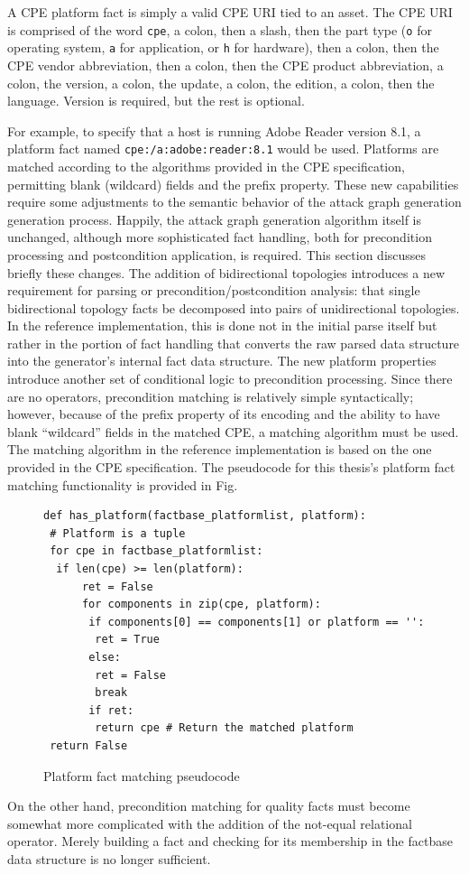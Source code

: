 A CPE platform fact is simply a valid CPE URI tied to an asset. The CPE URI is
comprised of the word \texttt{cpe}, a 
colon, then a slash, then the part type (\texttt{o} for operating system, \texttt{a} for
application, or \texttt{h} for hardware), then a colon, then the CPE vendor abbreviation,
then a colon, then the CPE product abbreviation, a colon, the version, a colon, the update, a colon, 
the edition, a colon, then the language. Version is required, but the rest is optional.

For example, to specify that a host is running Adobe Reader version 8.1, a 
platform fact named \texttt{cpe:/a:adobe:reader:8.1} would be used. Platforms
are matched according to the algorithms provided in the CPE specification,
permitting blank (wildcard) fields and the prefix property.
These new capabilities require some adjustments to the semantic behavior of the
attack graph generation generation process. Happily, the attack graph generation
algorithm itself is unchanged, although more sophisticated fact handling,
both for precondition processing and postcondition application,
is required. This section discusses briefly these changes.
The addition of bidirectional topologies introduces a new requirement for
parsing or precondition/postcondition analysis: that single bidirectional 
topology facts be decomposed into pairs
of unidirectional topologies. In the reference implementation, this is done
not in the initial parse itself but rather in the portion of fact handling that
converts the raw parsed data structure into the generator's internal fact
data structure.
The new platform properties introduce another set of conditional logic to
precondition processing. Since there are no operators, precondition matching
is relatively simple syntactically; however, because of the prefix
property of its encoding and the ability to have blank ``wildcard'' fields
in the matched CPE, a matching algorithm must be used. The matching algorithm
in the reference implementation is based on the one provided in the CPE
specification. %
The pseudocode for this thesis's platform fact matching functionality is
provided in Fig.~\cite{fig:cpe_match_pc}

\begin{figure}
\begin{lstlisting}
def has_platform(factbase_platformlist, platform):
 # Platform is a tuple
 for cpe in factbase_platformlist:
  if len(cpe) >= len(platform):
      ret = False
      for components in zip(cpe, platform):
       if components[0] == components[1] or platform == '':
        ret = True
       else:
        ret = False
        break
       if ret:
        return cpe # Return the matched platform
 return False
\end{lstlisting}
\caption{Platform fact matching pseudocode}
\label{fig:cpe_match_pc}
\end{figure}
On the other hand, precondition matching for quality facts must become
somewhat more complicated with the addition of the not-equal relational
operator. Merely building a fact and checking for its membership in the
factbase data structure is no longer sufficient. 

